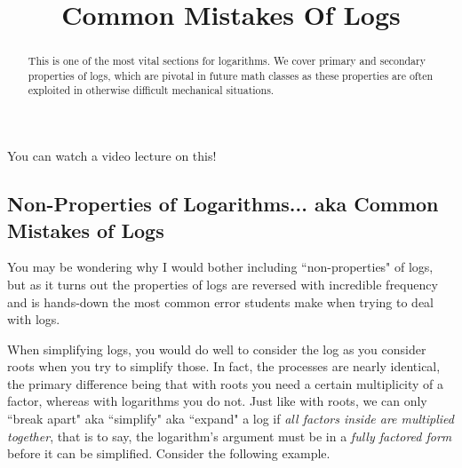 \documentclass{ximeraXloud}
\title{Common Mistakes Of Logs}
\begin{document}
\begin{abstract}
This is one of the most vital sections for logarithms. We cover primary and secondary properties of logs, which are pivotal in future math classes as these properties are often exploited in otherwise difficult mechanical situations.
\end{abstract}
\maketitle

You can watch a video lecture on this!


\subsection*{Non-Properties of Logarithms... aka Common Mistakes of Logs}
    
    You may be wondering why I would bother including ``non-properties" of logs, but as it turns out the properties of logs are reversed with incredible frequency and is hands-down the most common error students make when trying to deal with logs.
    
    When simplifying logs, you would do well to consider the log as you consider roots when you try to simplify those. In fact, the processes are nearly identical, the primary difference being that with roots you need a certain multiplicity of a factor, whereas with logarithms you do not. Just like with roots, we can only ``break apart" aka ``simplify" aka ``expand" a log if \textit{all factors inside are multiplied together}, that is to say, the logarithm's argument must be in a \textit{fully factored form} before it can be simplified. Consider the following example.
    
\end{document}
